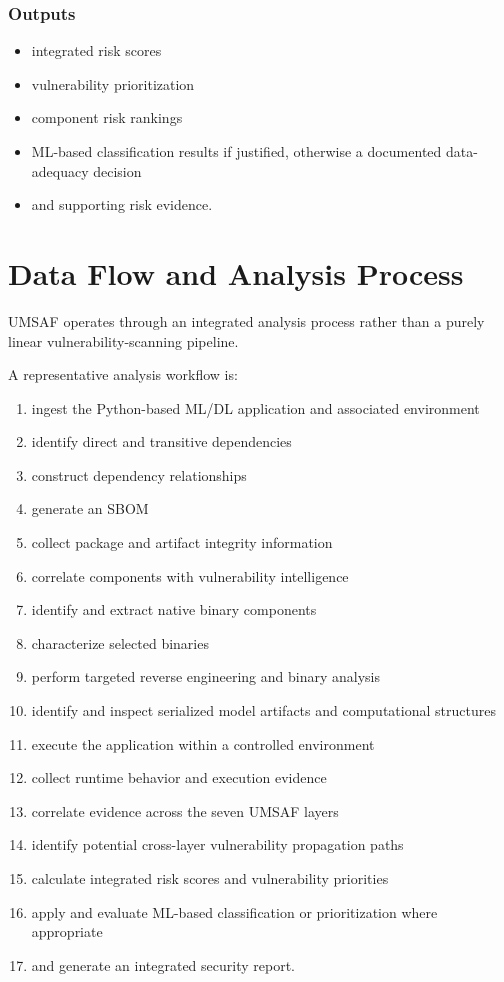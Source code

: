 \documentclass[
  12pt,
  letterpaper,
  oneside]{report}
\providecommand{\tightlist}{%
  \setlength{\itemsep}{0pt}\setlength{\parskip}{0pt}}
\begin{document}
\subsubsection{Outputs}\label{outputs-7}

\begin{itemize}
\tightlist
\item
  integrated risk scores
\item
  vulnerability prioritization
\item
  component risk rankings
\item
  ML-based classification results if justified, otherwise a documented
  data-adequacy decision
\item
  and supporting risk evidence.
\end{itemize}

\section{Data Flow and Analysis Process}\label{104-data-flow-and-analysis-process}

UMSAF operates through an integrated analysis process rather than a
purely linear vulnerability-scanning pipeline.

A representative analysis workflow is:

\begin{enumerate}
\def\labelenumi{\arabic{enumi}.}
\tightlist
\item
  ingest the Python-based ML/DL application and associated environment
\item
  identify direct and transitive dependencies
\item
  construct dependency relationships
\item
  generate an SBOM
\item
  collect package and artifact integrity information
\item
  correlate components with vulnerability intelligence
\item
  identify and extract native binary components
\item
  characterize selected binaries
\item
  perform targeted reverse engineering and binary analysis
\item
  identify and inspect serialized model artifacts and computational
  structures
\item
  execute the application within a controlled environment
\item
  collect runtime behavior and execution evidence
\item
  correlate evidence across the seven UMSAF layers
\item
  identify potential cross-layer vulnerability propagation paths
\item
  calculate integrated risk scores and vulnerability priorities
\item
  apply and evaluate ML-based classification or prioritization where
  appropriate
\item
  and generate an integrated security report.
\end{enumerate}
\end{document}
